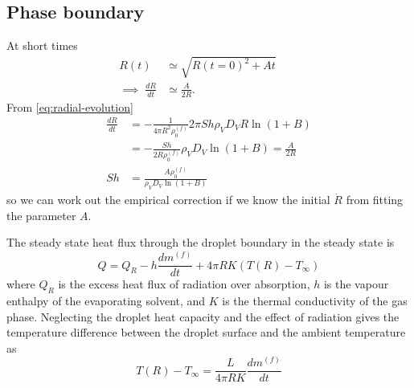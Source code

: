 \documentclass[12pt,twoside]{report}
\begin{document}
\subsection{Phase boundary}

At short times
\begin{subequations}
  \begin{align}
    R(t) &\simeq \sqrt{R(t=0)^2 + A t} \qquad \\
    \implies \; \frac{dR}{dt} &\simeq \frac{A}{2R}.
  \end{align}
\end{subequations}
From \eqref{eq:radial-evolution}
\begin{equation}
  \begin{aligned}
  \frac{dR}{dt} &=
  -\frac{1}{4\pi R^2 \rho^{(f)}_0}
  2\pi Sh \rho_V D_V R \ln{(1 + B)} \\
  &=
  -\frac{Sh}{2 R \rho^{(f)}_0}
  \rho_V D_V \ln{(1 + B)} =
  \frac{A}{2 R} \\
  Sh &= \frac{A \rho^{(f)}_0}{\rho_V D_V \ln{(1+B)}}
  \end{aligned}
\end{equation}
so we can work out the empirical correction if we know the initial $\dot{R}$ from fitting the parameter $A$.

The steady state heat flux through the droplet boundary in the steady state is \cite{Kulmala1993,Rovelli2016}
\begin{equation}
  Q = Q_R - h \frac{dm^{(f)}}{dt} + 4\pi R K (T(R) - T_\infty)
\end{equation}
where $Q_R$ is the excess heat flux of radiation over absorption, $h$ is the vapour enthalpy of the evaporating solvent, and $K$ is the thermal conductivity of the gas phase.
Neglecting the droplet heat capacity and the effect of radiation gives the temperature difference between
the droplet surface and the ambient temperature as \cite{Kulmala1993,Rovelli2016}
\begin{equation}
  T(R) - T_\infty = \frac{L}{4\pi R K} \frac{dm^{(f)}}{dt}
\end{equation}
\end{document}
